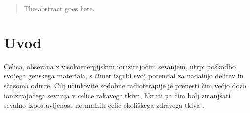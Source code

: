 \documentclass[journal]{IEEEtran}
\begin{document}







\maketitle

\begin{abstract}
The abstract goes here.
\end{abstract}







%
\IEEEpeerreviewmaketitle



\section{Uvod}

Celica, obsevana z visokoenergijskim ionizirajočim sevanjem, utrpi poškodbo svojega genskega materiala, s čimer izgubi svoj potencial za nadalnjo delitev in sčasoma odmre. Cilj učinkovite sodobne radioterapije je prenesti čim večjo dozo ionizirajočega sevanja v celice rakavega tkiva, hkrati pa čim bolj zmanjšati sevalno izpostavljenost normalnih celic okoliškega zdravega tkiva \cite{baskar2012}.
\end{document}
